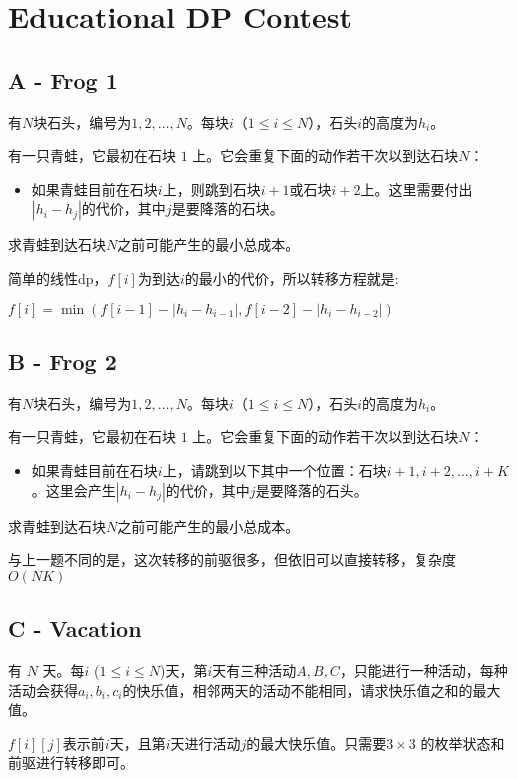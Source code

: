 \section{Educational DP Contest}

\subsection{A - Frog 1}
\begin{framed}
    有$N$块石头，编号为$1, 2, \ldots, N$。每块$i$（$1 \leq i \leq N$），石头$i$的高度为$h_i$。

    有一只青蛙，它最初在石块 $1$ 上。它会重复下面的动作若干次以到达石块$N$：
    \begin{itemize}
        \item 如果青蛙目前在石块$i$上，则跳到石块$i + 1$或石块$i + 2$上。这里需要付出$|h_i - h_j|$的代价，其中$j$是要降落的石块。
    \end{itemize}

    求青蛙到达石块$N$之前可能产生的最小总成本。
\end{framed}
简单的线性dp，$f[i]$为到达$i$的最小的代价，所以转移方程就是:

$f[i]=\min( f[i-1] - |h_i-h_{i-1}|,f[i-2]-|h_i-h_{i-2}|)$



\subsection{B - Frog 2}
\begin{framed}
    有$N$块石头，编号为$1, 2, \ldots, N$。每块$i$（$1 \leq i \leq N$），石头$i$的高度为$h_i$。

    有一只青蛙，它最初在石块 $1$ 上。它会重复下面的动作若干次以到达石块$N$：
    \begin{itemize}
        \item 如果青蛙目前在石块$i$上，请跳到以下其中一个位置：石块$i + 1, i + 2, \ldots, i + K$。这里会产生$|h_i - h_j|$的代价，其中$j$是要降落的石头。
    \end{itemize}
    求青蛙到达石块$N$之前可能产生的最小总成本。
\end{framed}
与上一题不同的是，这次转移的前驱很多，但依旧可以直接转移，复杂度$O(NK)$



\subsection{C - Vacation}
\begin{framed}
    有 $N$ 天。每$i$ ($1 \leq i \leq N$)天，第$i$天有三种活动$A,B,C$，只能进行一种活动，每种活动会获得$a_i,b_i,c_i$的快乐值，相邻两天的活动不能相同，请求快乐值之和的最大值。
\end{framed}
$f[i][j]$表示前$i$天，且第$i$天进行活动$j$的最大快乐值。只需要$3\times 3$ 的枚举状态和前驱进行转移即可。



